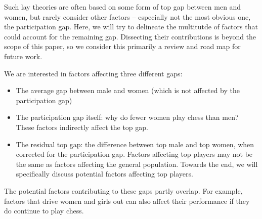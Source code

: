 Such lay theories are often based on some form of top gap between men and women, but rarely consider other factors -- especially not the most obvious one, the participation gap. Here, we will try to delineate the multitutde of factors that could account for the remaining gap. Dissecting their contributions is beyond the scope of this paper, so we consider this primarily a review and road map for future work.

We are interested in factors affecting  three different gaps:
\begin{itemize}
    \item The average gap between male and women (which is not affected by the participation gap)
    \item The participation gap itself: why do fewer women play chess than men? These factors indirectly affect the top gap.
    \item The residual top gap: the difference between top male and top women, when corrected for the participation gap. Factors affecting top players may not be the same as factors affecting the general population. Towards the end, we will specifically discuss potential factors affecting top players. 
\end{itemize}
The potential factors contributing to these gaps partly overlap. For example, factors that drive women and girls out can also affect their performance if they do continue to play chess.





